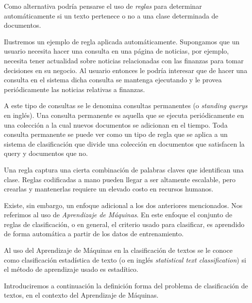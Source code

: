 \documentclass{llncs}
\begin{document}
	Como alternativa podr\'ia pensarse el uso de \emph{reglas} para determinar autom\'aticamente si un texto pertenece o no a una clase determinada de documentos.
	
	Ilustremos un ejemplo de regla aplicada autom\'aticamente. Supongamos que un usuario necesita hacer una consulta en una p\'agina de noticias, por ejemplo, necesita tener actualidad sobre noticias relacionadas con las finanzas para tomar decisiones en su negocio. Al usuario entonces le podr\'ia interesar que de hacer una consulta en el sistema dicha consulta se mantenga ejecutando y le provea peri\'odicamente las noticias relativas a finanzas. 
	
	A este tipo de consultas se le denomina consultas permanentes  (o \emph{standing querys} en ingl\'es). Una consulta permanente es aquella que se ejecuta peri\'odicamente en una colecci\'on a la cual nuevos  documentos se adicionan en el tiempo. Toda consulta permanente se puede ver como un tipo de regla que se aplica a un sistema de clasificaci\'on que divide una colecci\'on en documentos que satisfacen la query y documentos que no.
	
	
	
	Una regla captura una cierta combinaci\'on de palabras claves que identifican una clase. Reglas codificadas a mano pueden llegar a ser altamente escalable, pero crearlas y mantenerlas requiere un elevado costo en recursos humanos.
	
	Existe, sin embargo, un enfoque adicional a los dos anteriores mencionados. Nos referimos al uso de \emph{Aprendizaje de M\'aquinas}. En este enfoque el conjunto de reglas de clasificaci\'on, o en general, el criterio usado para clasificar, es aprendido de forma autom\'atica a partir de los datos de entrenamiento.
	
	Al uso del Aprendizaje de M\'aquinas en la clasificaci\'on de textos se le conoce como clasificaci\'on estad\'istica de texto (o en ingl\'es \emph{statistical text classification}) si el m\'etodo de aprendizaje usado es estad\'itico.
	
	Introduciremos a continuaci\'on la definici\'on forma del problema de clasificaci\'on de textos, en el contexto del Aprendizaje de M\'aquinas.
	
\end{document}
